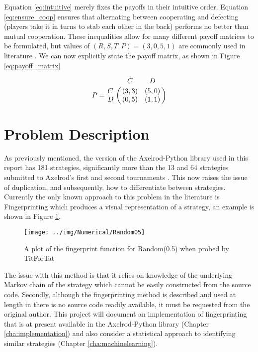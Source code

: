 Equation \ref{eq:intuitive} merely fixes the payoffs in their intuitive order.
Equation \ref{eq:ensure_coop} ensures that alternating between cooperating and defecting (players take it in turns to stab each other in the back) performs no better than mutual cooperation.
These inequalities allow for many different payoff matrices to be formulated, but values of $(R, S, T, P) = (3, 0, 5, 1)$ are commonly used in literature \cite{Axelrod1984, Axelrod1980a, Axelrod1980a}.
We can now explicitly state the payoff matrix, as shown in Figure \ref{eq:payoff_matrix}

\begin{equation}\label{eq:payoff_matrix}
%
P = \bordermatrix{~ & C & D \cr
                  C & (3, 3) & (5, 0) \cr
                  D & (0, 5) & (1, 1) \cr}
%
\end{equation}

\section{Problem Description}

As previously mentioned, the version of the Axelrod-Python library used in this report has 181 strategies, significantly more than the 13 and 64 strategies submitted to Axelrod's first and second tournaments \cite{Axelrod1980a, Axelrod1980b}.
This now raises the issue of duplication, and subsequently, how to differentiate between strategies.
Currently the only known approach to this problem in the literature is Fingerprinting which produces a visual representation of a strategy, an example is shown in Figure \ref{fig:example_fing}.

\begin{figure}[tb]
    \centering
    \texttt{[image: ../img/Numerical/Random05]}
    \caption{A plot of the fingerprint function for Random(0.5) when probed by TitForTat}
    \label{fig:example_fing}
\end{figure}

The issue with this method is that it relies on knowledge of the underlying Markov chain of the strategy which cannot be easily constructed from the source code.
Secondly, although the fingerprinting method is described and used at length in \cite{Ashlock2008,Ashlock2010, Ashlock2004, Ashlock2005, Ashlock2009, Ashlock2006,} there is no source code readily available, it must be requested from the original author.
This project will document an implementation of fingerprinting that is at present available in the Axelrod-Python library (Chapter \ref{cha:implementation}) and also consider a statistical approach to identifying similar strategies (Chapter \ref{cha:machinelearning}).



